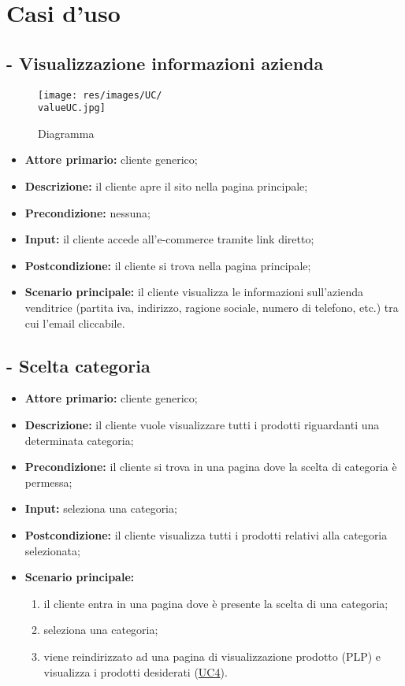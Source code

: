 \section{Casi d'uso}

\resetCUC

\stepUserCase
\subsection{ - Visualizzazione informazioni azienda}
\begin{figure}[H]
    \centering
    \texttt{[image: res/images/UC/\\valueUC.jpg]}
    \caption{Diagramma }
\end{figure}
\begin{itemize}
    \item \textbf{Attore primario:} cliente generico;
    \item \textbf{Descrizione:} il cliente apre il sito nella pagina principale;
    \item \textbf{Precondizione:} nessuna;
    \item \textbf{Input:} il cliente accede all'e-commerce tramite link diretto;
    \item \textbf{Postcondizione:} il cliente si trova nella pagina principale;
    \item \textbf{Scenario principale:} il cliente visualizza le informazioni sull'azienda venditrice (partita iva, indirizzo, ragione sociale, numero di telefono, etc.) tra cui l'email cliccabile.
\end{itemize}


\stepUserCase
\subsection{ - Scelta categoria}
\begin{itemize}
    \item \textbf{Attore primario:} cliente generico;
    \item \textbf{Descrizione:} il cliente vuole visualizzare tutti i prodotti riguardanti una determinata categoria;
    \item \textbf{Precondizione:} il cliente si trova in una pagina dove la scelta di categoria è permessa;
    \item \textbf{Input:} seleziona una categoria;
    \item \textbf{Postcondizione:} il cliente visualizza tutti i prodotti relativi alla categoria selezionata;
    \item \textbf{Scenario principale:}
          \begin{enumerate}
              \item il cliente entra in una pagina dove è presente la scelta di una categoria;
              \item seleziona una categoria;
              \item viene reindirizzato ad una pagina di visualizzazione prodotto (PLP) e visualizza i prodotti desiderati (\hyperref[UC4]{UC4}).
          \end{enumerate}
\end{itemize}

